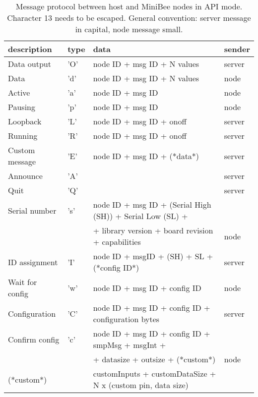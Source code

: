 \documentclass[letterpaper,10pt]{article}
\begin{document}
\begin{table}
 
\begin{center}
\begin{tabular}{llll}
description & type & data & sender\\
\hline
Data output & 'O' & node ID + msg ID + N values & server\\
Data & 'd' & node ID + msg ID + N values & node\\
Active & 'a' & node ID + msg ID & node\\
Pausing & 'p' & node ID + msg ID & node\\
Loopback & 'L' & node ID + msg ID + onoff & server\\
Running & 'R' & node ID + msg ID + onoff & server\\
Custom message & 'E' & node ID + msg ID + (*data*) & server\\
\hline
Announce & 'A' &  & server \\
Quit & 'Q' &  & server \\
Serial number & 's' & node ID + msg ID + (Serial High (SH)) + Serial Low (SL) +& \\
			&	  & + library version + board revision + capabilities & node\\
ID assignment & 'I' & node ID + msgID + (SH) + SL + (*config ID*) & server \\
Wait for config & 'w' & node ID + msg ID + config ID & node \\
Configuration & 'C' & node ID  + msg ID + config ID + configuration bytes & server \\
Confirm config & 'c' & node ID + msg ID + config ID + smpMsg + msgInt + & \\
                           &        & + datasize + outsize + (*custom*) & node \\
(*custom*) &  & customInputs + customDataSize + N x (custom pin, data size) & \\
\hline
\end{tabular}
\end{center}
\caption{Message protocol between host and MiniBee nodes in API mode. Character 13 needs to be escaped. General convention: server message in capital, node message small.}
\end{table}
\end{document}
